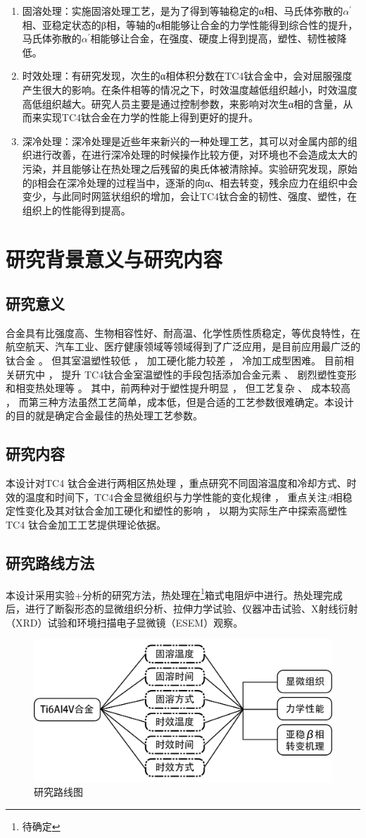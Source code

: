 \begin{enumerate}
	\item 固溶处理：实施固溶处理工艺，是为了得到等轴稳定的α相、马氏体弥散的$ α^{'} $相、亚稳定状态的β相，等轴的α相能够让合金的力学性能得到综合性的提升，马氏体弥散的$ α^{'} $相能够让合金，在强度、硬度上得到提高，塑性、韧性被降低\cite{gurong2002}。
	\item 时效处理：有研究\cite{timing}发现，次生的α相体积分数在TC4钛合金中，会对屈服强度产生很大的影响。在条件相等的情况之下，时效温度越低组织越小，时效温度高低组织越大。研究人员主要是通过控制参数，来影响对次生α相的含量，从而来实现TC4钛合金在力学的性能上得到更好的提升。
	\item 深冷处理：深冷处理是近些年来新兴的一种处理工艺，其可以对金属内部的组织进行改善，在进行深冷处理的时候操作比较方便，对环境也不会造成太大的污染，并且能够让在热处理之后残留的奥氏体被清除掉。实验研究发现，原始的β相会在深冷处理的过程当中，逐渐的向α、相去转变，残余应力在组织中会变少，与此同时网篮状组织的增加，会让TC4钛合金的韧性、强度、塑性，在组织上的性能得到提高。
\end{enumerate}

\section{研究背景意义与研究内容}
\subsection{研究意义}
\ti 合金具有比强度高、生物相容性好、耐高温、化学性质性质稳定，等优良特性，在航空航天、汽车工业、医疗健康领域等领域得到了广泛应用，是目前应用最广泛的钛合金 。 但其室温塑性较低 ， 加工硬化能力较差 ， 冷加工成型困难。 目前相关研宄中 ， 提升 TC4钛合金室温塑性的手段包括添加合金元素 、 剧烈塑性变形和相变热处理等 。 其中，前两种对于塑性提升明显 ， 但工艺复杂 、 成本较高\cite{miao} ， 而第三种方法虽然工艺简单，成本低，但是合适的工艺参数很难确定。本设计的目的就是确定\ti 合金最佳的热处理工艺参数。
\subsection{研究内容}
本设计对TC4 钛合金进行两相区热处理 ，重点研究不同固溶温度和冷却方式、时效的温度和时间下，TC4合金显微组织与力学性能的变化规律 ， 重点关注$ \beta  $相稳定性变化及其对钛合金加工硬化和塑性的影响 ， 以期为实际生产中探索高塑性 TC4 钛合金加工工艺提供理论依据。
\subsection{研究路线方法}
本设计采用实验+分析的研究方法，热处理在\footnote{待确定}箱式电阻炉中进行。热处理完成后，进行了断裂形态的显微组织分析、拉伸力学试验、仪器冲击试验、X射线衍射（XRD）试验和环境扫描电子显微镜（ESEM）观察。
\begin{figure}[h!]
	\centering
	\includegraphics[width=0.7\linewidth]{pic/路线图}
	\caption{研究路线图}
	\label{fig:roadmap}
\end{figure}
